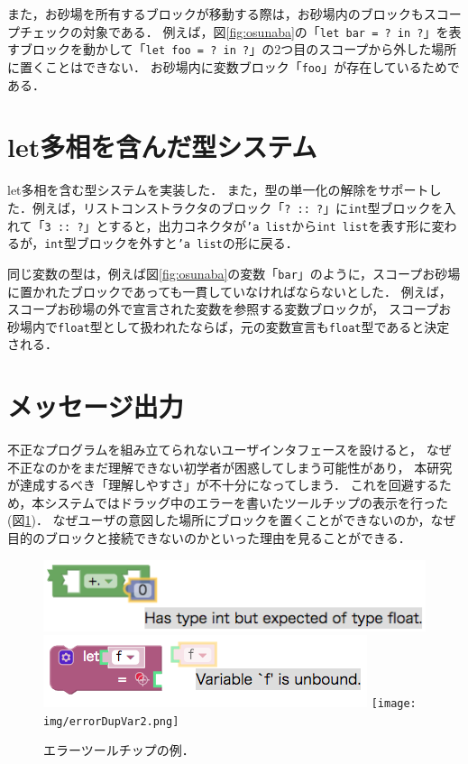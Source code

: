 また，お砂場を所有するブロックが移動する際は，お砂場内のブロックもスコープチェックの対象である．
例えば，図\ref{fig:osunaba}の「{\tt let bar = ?\ in ?}」を表すブロックを動かして「{\tt let foo = ?\ in ?}」の2つ目のスコープから外した場所に置くことはできない．
お砂場内に変数ブロック「{\tt foo}」が存在しているためである．


\section {let多相を含んだ型システム}

let多相を含む型システムを実装した．
また，型の単一化の解除をサポートした．例えば，リストコンストラクタのブロック「{\tt ?\ ::\ ?}」に{\tt int}型ブロックを入れて「{\tt 3 ::\ ?}」とすると，出力コネクタが{\tt 'a list}から{\tt int list}を表す形に変わるが，{\tt int}型ブロックを外すと{\tt 'a list}の形に戻る．

同じ変数の型は，例えば図\ref{fig:osunaba}の変数「{\tt bar}」のように，スコープお砂場に置かれたブロックであっても一貫していなければならないとした．
例えば，スコープお砂場の外で宣言された変数を参照する変数ブロックが，
スコープお砂場内で{\tt float}型として扱われたならば，元の変数宣言も{\tt float}型であると決定される．

\section {メッセージ出力\label{fun:message}}

不正なプログラムを組み立てられないユーザインタフェースを設けると，
なぜ不正なのかをまだ理解できない初学者が困惑してしまう可能性があり，
本研究が達成するべき「理解しやすさ」が不十分になってしまう．
これを回避するため，本システムではドラッグ中のエラーを書いたツールチップの表示を行った(図\ref{fig:errorOutput})．
なぜユーザの意図した場所にブロックを置くことができないのか，なぜ目的のブロックと接続できないのかといった理由を見ることができる．

\begin{figure}[h]
 \centering
 \includegraphics[keepaspectratio, scale=0.4]{img/errorIntFloat.png}
 \includegraphics[keepaspectratio, scale=0.4]{img/errorUnbound.png}
  \texttt{[image: img/errorDupVar2.png]}
 \caption{エラーツールチップの例．\label{fig:errorOutput}}
\end{figure}

